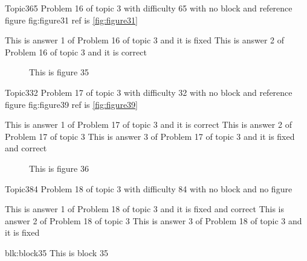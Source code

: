 \documentclass[master]{exam}
\begin{document}
\begin{problem}{Topic3}{65}
	Problem 16 of topic 3 with difficulty 65 with no block and reference figure fig:figure31 ref is \ref{fig:figure31}
	\begin{answers}
		\answer[fixed] This is answer 1 of Problem 16 of topic 3 and it is fixed
		\answer[correct] This is answer 2 of Problem 16 of topic 3 and it is correct
	\end{answers}
\end{problem}



\begin{figure}
	\begin{center}
		This is figure 35 
		\label{fig:figure35}
	\end{center}
\end{figure}

\begin{problem}{Topic3}{32}
	Problem 17 of topic 3 with difficulty 32 with no block and reference figure fig:figure39 ref is \ref{fig:figure39}
	\begin{answers}
		\answer[correct] This is answer 1 of Problem 17 of topic 3 and it is correct
		\answer This is answer 2 of Problem 17 of topic 3 
		 This is answer 3 of Problem 17 of topic 3 and it is fixed and correct
	\end{answers}
\end{problem}



\begin{figure}
	\begin{center}
		This is figure 36 
		\label{fig:figure36}
	\end{center}
\end{figure}

\begin{problem}{Topic3}{84}
	Problem 18 of topic 3 with difficulty 84 with no block and no figure
	\begin{answers}
		 This is answer 1 of Problem 18 of topic 3 and it is fixed and correct
		\answer This is answer 2 of Problem 18 of topic 3 
		\answer[fixed] This is answer 3 of Problem 18 of topic 3 and it is fixed
	\end{answers}
\end{problem}



\begin{block}{blk:block35}
This is block 35
\end{block}
\end{document}
